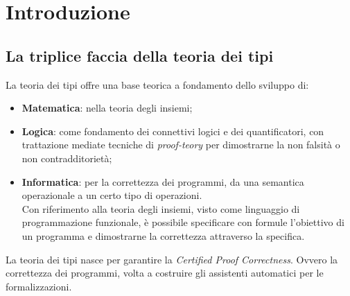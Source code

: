\documentclass[10pt,a4paper, italian]{book}
\begin{document}
\tableofcontents \pagebreak

\chapter{Introduzione}
\label{cap:introduzione}
\section{La triplice faccia della teoria dei tipi}
\label{sec:la-triplice-faccia}
La teoria dei tipi offre una base teorica a fondamento dello sviluppo di:
\begin{itemize}
\item \textbf{Matematica}: nella teoria degli insiemi;
\item \textbf{Logica}: come fondamento dei connettivi logici e dei quantificatori, con trattazione mediate tecniche di \textit{proof-teory} per dimostrarne la non falsit\`a o non contradditoriet\`a;
\item \textbf{Informatica}: per la correttezza dei programmi, da una semantica operazionale a un certo tipo di operazioni.\\ 
Con riferimento alla teoria degli insiemi, visto come linguaggio di programmazione funzionale, \`e possibile specificare con formule l'obiettivo di un programma e dimostrarne la correttezza attraverso la specifica.
\end{itemize}
\noindent
La teoria dei tipi nasce per garantire la \textit{Certified Proof Correctness}. Ovvero la correttezza dei programmi, volta a costruire gli assistenti automatici per le formalizzazioni.
\end{document}

